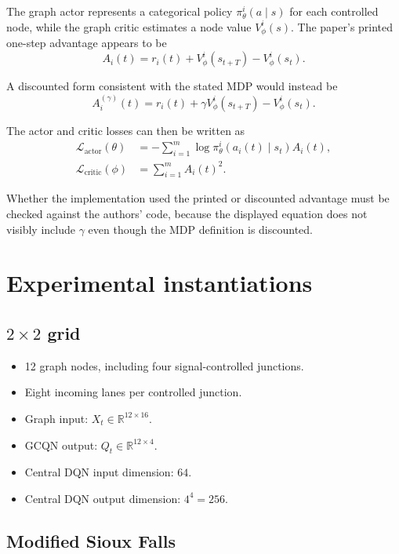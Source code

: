 \documentclass[11pt]{article}
\begin{document}
The graph actor represents a categorical policy $\pi_\theta^i(a\mid s)$ for each controlled node, while the graph critic estimates a node value $V_\phi^i(s)$. The paper's printed one-step advantage appears to be
\begin{equation}
A_i(t)
=
r_i(t)
+
V_\phi^i(s_{t+T})
-
V_\phi^i(s_t).
\end{equation}

A discounted form consistent with the stated MDP would instead be
\begin{equation}
A_i^{(\gamma)}(t)
=
r_i(t)
+
\gamma V_\phi^i(s_{t+T})
-
V_\phi^i(s_t).
\end{equation}

The actor and critic losses can then be written as
\begin{align}
\mathcal{L}_{\mathrm{actor}}(\theta)
&=-\sum_{i=1}^{m}
\log \pi_\theta^i\!\left(a_i(t)\mid s_t\right)A_i(t),\\
\mathcal{L}_{\mathrm{critic}}(\phi)
&=\sum_{i=1}^{m}A_i(t)^2.
\end{align}

Whether the implementation used the printed or discounted advantage must be checked against the authors' code, because the displayed equation does not visibly include $\gamma$ even though the MDP definition is discounted.

\section{Experimental instantiations}

\subsection{$2\times2$ grid}

\begin{itemize}
    \item 12 graph nodes, including four signal-controlled junctions.
    \item Eight incoming lanes per controlled junction.
    \item Graph input: $X_t\in\mathbb{R}^{12\times16}$.
    \item GCQN output: $Q_t\in\mathbb{R}^{12\times4}$.
    \item Central DQN input dimension: $64$.
    \item Central DQN output dimension: $4^4=256$.
\end{itemize}

\subsection{Modified Sioux Falls}
\end{document}
